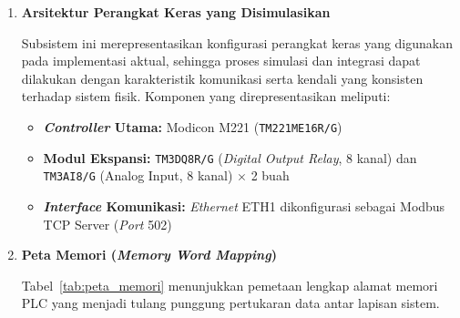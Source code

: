 \begin{enumerate}
\item[a.] \textbf{Arsitektur Perangkat Keras yang Disimulasikan}

Subsistem ini merepresentasikan konfigurasi perangkat keras yang digunakan pada implementasi aktual, sehingga proses simulasi dan integrasi dapat dilakukan dengan karakteristik komunikasi serta kendali yang konsisten terhadap sistem fisik. Komponen yang direpresentasikan meliputi:

\begin{itemize}
    \item[i.] \textbf{\textit{Controller} Utama:} Modicon M221 (\texttt{TM221ME16R/G})
    \item[ii.] \textbf{Modul Ekspansi:} \texttt{TM3DQ8R/G} (\textit{Digital Output Relay}, 8 kanal) dan \texttt{TM3AI8/G} (Analog Input, 8 kanal) $\times$ 2 buah
    \item[iii.] \textbf{\textit{Interface} Komunikasi:} \textit{Ethernet} ETH1 dikonfigurasi sebagai Modbus TCP Server (\textit{Port} 502)
\end{itemize}

\item[b.] \textbf{Peta Memori (\textit{Memory Word Mapping})}

Tabel~\ref{tab:peta_memori} menunjukkan pemetaan lengkap alamat memori PLC yang menjadi tulang punggung pertukaran data antar lapisan sistem.


\end{enumerate}
